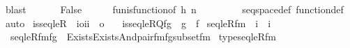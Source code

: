 \begin{isabellebody}
\ blast\isanewline
\ \ \isamarkupfalse%
\isanewline
\ \ \isamarkupfalse%
\ {\isachardoublequoteopen}False{\isachardoublequoteclose}\isanewline
\ \ \ \ \isamarkupfalse%
\ fun{\isacharunderscore}{\kern0pt}is{\isacharunderscore}{\kern0pt}function{\isacharbrackleft}{\kern0pt}of\ h\ n\ {\isachardoublequoteopen}{\isasymlambda}{\isacharunderscore}{\kern0pt}{\isachardot}{\kern0pt}\ {}{\isachardoublequoteclose}{\isacharbrackright}{\kern0pt}\ \isanewline
\ \ \ \ \isamarkupfalse%
\ seqspace{\isacharunderscore}{\kern0pt}def\ function{\isacharunderscore}{\kern0pt}def\ \isamarkupfalse%
\ auto\isanewline
{}\isamarkupfalse%
%
\endisatagproof
{\isafoldproof}%
%
\isadelimproof
\isanewline
%
\endisadelimproof
\isanewline
{}\isamarkupfalse%
\ is{\isacharunderscore}{\kern0pt}seqleR\ {\isacharcolon}{\kern0pt}{\isacharcolon}{\kern0pt}\ {\isachardoublequoteopen}{\isacharbrackleft}{\kern0pt}i{\isasymRightarrow}o{\isacharcomma}{\kern0pt}i{\isacharcomma}{\kern0pt}i{\isacharbrackright}{\kern0pt}\ {\isasymRightarrow}\ o{\isachardoublequoteclose}\ \isanewline
\ \ {\isachardoublequoteopen}is{\isacharunderscore}{\kern0pt}seqleR{\isacharparenleft}{\kern0pt}Q{\isacharcomma}{\kern0pt}f{\isacharcomma}{\kern0pt}g{\isacharparenright}{\kern0pt}\ {\isasymequiv}\ g\ {\isasymsubseteq}\ f{\isachardoublequoteclose}\isanewline
\isanewline
{}\isamarkupfalse%
\ seqleR{\isacharunderscore}{\kern0pt}fm\ {\isacharcolon}{\kern0pt}{\isacharcolon}{\kern0pt}\ {\isachardoublequoteopen}i\ {\isasymRightarrow}\ i{\isachardoublequoteclose}\ \isanewline
\ \ {\isachardoublequoteopen}seqleR{\isacharunderscore}{\kern0pt}fm{\isacharparenleft}{\kern0pt}fg{\isacharparenright}{\kern0pt}\ {\isasymequiv}\ Exists{\isacharparenleft}{\kern0pt}Exists{\isacharparenleft}{\kern0pt}And{\isacharparenleft}{\kern0pt}pair{\isacharunderscore}{\kern0pt}fm{\isacharparenleft}{\kern0pt}{}{\isacharcomma}{\kern0pt}{}{\isacharcomma}{\kern0pt}fg{\isacharhash}{\kern0pt}{\isacharplus}{\kern0pt}{}{\isacharparenright}{\kern0pt}{\isacharcomma}{\kern0pt}subset{\isacharunderscore}{\kern0pt}fm{\isacharparenleft}{\kern0pt}{}{\isacharcomma}{\kern0pt}{}{\isacharparenright}{\kern0pt}{\isacharparenright}{\kern0pt}{\isacharparenright}{\kern0pt}{\isacharparenright}{\kern0pt}{\isachardoublequoteclose}\isanewline
\isanewline
{}\isamarkupfalse%
\ type{\isacharunderscore}{\kern0pt}seqleR{\isacharunderscore}{\kern0pt}fm\ {\isacharcolon}{\kern0pt}\isanewline

\end{isabellebody}
